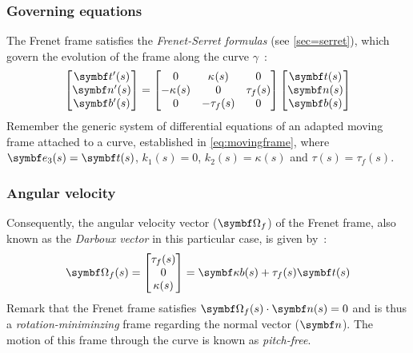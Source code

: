 \subsubsection{Governing equations}\label{sec=serretfrenet}
The Frenet frame satisfies the \emph{Frenet-Serret formulas} (see \cref{sec=serret}), which govern the evolution of the frame along the curve $\gamma$~:
\begin{equation}
	\begin{bmatrix}
		\vect{t}'(s) \\
		\vect{n}'(s) \\
		\vect{b}'(s)
	\end{bmatrix}
	=
	\begin{bmatrix}
		0 & \kappa_{}(s) & 0 \\
		-\kappa_{}(s) & 0 & \tau_f(s) \\
		0 & -\tau_f(s) & 0
	\end{bmatrix}
	\begin{bmatrix}
		\vect{t}(s) \\
		\vect{n}(s) \\
		\vect{b}(s)
	\end{bmatrix}
\label{eq:frenetframegoverning}
\end{equation}
Remember the generic system of differential equations of an adapted moving frame attached to a curve, established in \cref{eq:movingframe}, where $\vect{e}_{3}(s) = \vect{t}(s)$, $k_{1}(s) = 0$, $k_{2}(s) = \kappa(s)$ and $\tau(s)= \tau_{f}(s)$.

\subsubsection{Angular velocity}
Consequently, the angular velocity vector ($\vect{\Omega_{f}}$) of the Frenet frame, also known as the \emph{Darboux vector} in this particular case, is given by~:
\begin{equation}
	\vect{\Omega_f}(s)
	=
	\begin{bmatrix}
		\tau_{f}(s) \\
		0 \\
		\kappa(s)
	\end{bmatrix}
	= \vect{\kappa b}(s) +\tau_{f}(s) \vect{t}(s)
\end{equation}
Remark that the Frenet frame satisfies $\vect{\Omega_f}(s) \cdot \vect{n}(s) = 0$ and is thus a \emph{rotation-miniminzing} frame regarding the normal vector ($\vect{n}$). The motion of this frame through the curve is known as \emph{pitch-free}.

